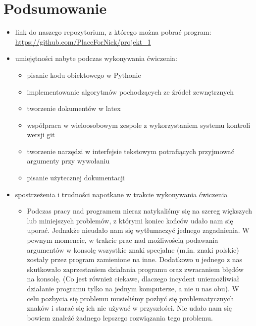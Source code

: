 	\section{Podsumowanie}
		\begin{itemize}
			\item link do naszego repozytorium, z którego można pobrać program:\\	\url{https://github.com/PlaceForNick/projekt_1}
			\item umiejętności nabyte podczas wykonywania ćwiczenia:
				\begin{itemize}
					\item pisanie kodu obiektowego w Pythonie
					\item implementowanie algorytmów pochodzących ze źródeł zewnętrznych
					\item  tworzenie dokumentów w latex
					\item współpraca w wieloosobowym zespole z wykorzystaniem systemu kontroli wersji git
					\item tworzenie narzędzi w interfejsie tekstowym potrafiących przyjmować argumenty przy wywołaniu 
					\item pisanie użytecznej dokumentacji
			\end{itemize}
			\item spostrzeżenia i trudności napotkane w trakcie wykonywania ćwiczenia
				\begin{itemize}
					\item Podczas pracy nad programem nieraz natykaliśmy się na szereg większych lub miniejszych problemów, z którymi koniec końców udało nam się uporać. Jednakże nieudało nam się wytłumaczyć jednego zagadnienia. W pewnym momencie, w trakcie prac nad możliwością podawania argumentów w konsolę wszystkie znaki specjalne (m.in. znaki polskie) zostały przez program zamienione na inne. Dodatkowo u jednego z nas skutkowało zaprzestaniem działania programu oraz zwracaniem błędów na konsolę. (Co jest również ciekawe, dlaczego incydent uniemożliwiał działanie programu tylko na jednym komputerze, a nie u nas obu). W celu pozbycia się problemu musieliśmy pozbyć się problematycznych znaków i starać się ich nie używać w przyszłości. Nie udało nam się bowiem znaleźć żadnego lepszego rozwiązania tego problemu. 
				\end{itemize}
			
		\end{itemize}
